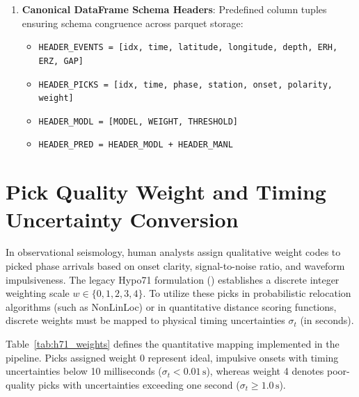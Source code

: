 \begin{enumerate}
  \item \textbf{Canonical DataFrame Schema Headers}:
  Predefined column tuples ensuring schema congruence across parquet storage:
  \begin{itemize}
    \item \texttt{HEADER\_EVENTS = [idx, time, latitude, longitude, depth, ERH, ERZ, GAP]}
    \item \texttt{HEADER\_PICKS = [idx, time, phase, station, onset, polarity, weight]}
    \item \texttt{HEADER\_MODL = [MODEL, WEIGHT, THRESHOLD]}
    \item \texttt{HEADER\_PRED = HEADER\_MODL + HEADER\_MANL}
  \end{itemize}
\end{enumerate}

\section{Pick Quality Weight and Timing Uncertainty Conversion}
\label{sec:weight_conversion}

In observational seismology, human analysts assign qualitative weight codes to picked phase arrivals based on onset clarity, signal-to-noise ratio, and waveform impulsiveness. The legacy Hypo71 formulation (\cite{Hypo71}) establishes a discrete integer weighting scale $w \in \{0, 1, 2, 3, 4\}$. To utilize these picks in probabilistic relocation algorithms (such as NonLinLoc) or in quantitative distance scoring functions, discrete weights must be mapped to physical timing uncertainties $\sigma_t$ (in seconds).

Table~\ref{tab:h71_weights} defines the quantitative mapping implemented in the pipeline. Picks assigned weight 0 represent ideal, impulsive onsets with timing uncertainties below 10 milliseconds ($\sigma_t < 0.01\,\mathrm{s}$), whereas weight 4 denotes poor-quality picks with uncertainties exceeding one second ($\sigma_t \ge 1.0\,\mathrm{s}$).

